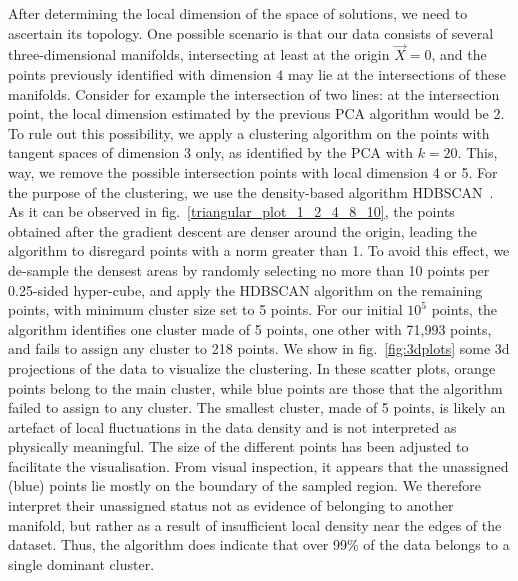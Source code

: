 \documentclass[11pt,a4paper]{article}
\begin{document}
	After determining the local dimension of the space of solutions, we need to ascertain its topology. 
One possible scenario is that our data consists of several three-dimensional manifolds, intersecting at least at the origin $\vec{X}=0$, and the points previously identified with dimension $4$ may lie at the intersections of these manifolds. 
Consider for example the intersection of two lines: at the intersection point, the local dimension estimated by the previous PCA algorithm would be 2. 
To rule out this possibility, we apply a clustering algorithm on the points with tangent spaces of dimension 3 only, as identified by the PCA with $k=20$. 
This, way, we remove the possible intersection points with local dimension 4 or 5. 
For the purpose of the clustering, we use the density-based algorithm HDBSCAN~\cite{10.1007/978-3-642-37456-2_14}. 
As it can be observed in fig.~\ref{triangular_plot_1_2_4_8_10}, the points obtained after the gradient descent are denser around the origin, leading the algorithm to disregard points with a norm greater than 1. 
To avoid this effect, we de-sample the densest areas by randomly selecting no more than 10 points per 0.25-sided hyper-cube, and apply the HDBSCAN algorithm on the remaining points, with minimum cluster size set to 5 points. 
For our initial $10^5$ points, the algorithm identifies one cluster made of 5 points, one other with 71,993 points, and fails to assign any cluster to 218 points. We show in fig.~\ref{fig:3dplots} some 3d projections of the data to visualize the clustering. In these scatter plots, orange points belong to the main cluster, while blue points are those that the algorithm failed to assign to any cluster. The smallest cluster, made of 5 points, is likely an artefact of local fluctuations in the data density and is not interpreted as physically meaningful. The size of the different points has been adjusted to facilitate the visualisation. From visual inspection, it appears that the unassigned (blue) points lie mostly on the boundary of the sampled region. We therefore interpret their unassigned status not as evidence of belonging to another manifold, but rather as a result of insufficient local density near the edges of the dataset. Thus, the algorithm does indicate that over 99\% of the data belongs to a single dominant cluster.
\end{document}
